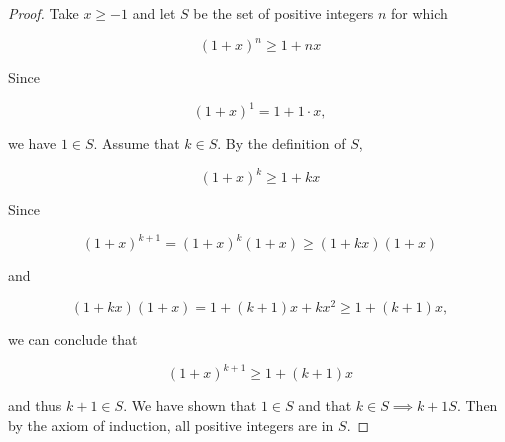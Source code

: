     \begin{proof}
        \noindent Take $x\geq -1$ and let $S$ be the set of positive integers $n$ for which

        \begin{equation*}
            \left(1+x\right)^n \geq 1 + nx
        \end{equation*}

        \noindent Since

        \begin{equation*}
            \left(1+x\right)^1 = 1 + 1\cdot x,
        \end{equation*}

        \noindent we have $1\in S$. Assume that $k\in S$. By the definition of $S$,

        \begin{equation*}
            \left(1+x\right)^k \geq 1 + kx
        \end{equation*}

        \noindent Since

        \begin{equation*}
            \left(1+x\right)^{k+1} = \left(1+x\right)^k (1 + x) \geq (1 + kx)(1+x)
        \end{equation*}

        \noindent and

        \begin{equation*}
            (1+kx)(1+x) = 1+(k+1)x + kx^2 \geq 1 + (k+1) x,
        \end{equation*}

        \noindent we can conclude that

        \begin{equation*}
            \left(1+x\right)^{k+1} \geq 1 + (k+1)x
        \end{equation*}

        \noindent and thus $k+1\in S$. We have shown that $1\in S$ and that $k\in S\implies k+1 S$. Then by the axiom of induction, all positive integers are in $S$.
    \end{proof}

